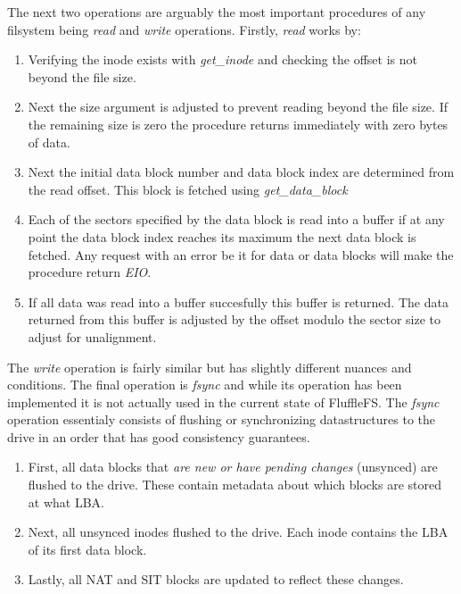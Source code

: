 The next two operations are arguably the most important procedures of any
filsystem being \textit{read} and \textit{write} operations. Firstly,
\textit{read} works by:

\begin{enumerate}
    \item Verifying the inode exists with \textit{get\_inode} and checking the
    offset is not beyond the file size.
    \item Next the size argument is adjusted to prevent reading beyond the file
    size. If the remaining size is zero the procedure returns immediately with
    zero bytes of data.
    \item Next the initial data block number and data block index are determined
    from the read offset. This block is fetched using \textit{get\_data\_block}
    \item Each of the sectors specified by the data block is read into a buffer
    if at any point the data block index reaches its maximum the next data
    block is fetched. Any request with an error be it for data or data
    blocks will make the procedure return \textit{EIO}.
    \item If all data was read into a buffer succesfully this buffer is
    returned. The data returned from this buffer is adjusted by the offset
    modulo the sector size to adjust for unalignment.
\end{enumerate}

The \textit{write} operation is fairly similar but has slightly different
nuances and conditions. The final operation is \textit{fsync} and while its
operation has been implemented it is not actually used in the current state
of FluffleFS. The \textit{fsync} operation essentialy consists of flushing
or synchronizing datastructures to the drive in an order that has good
consistency guarantees.

\begin{enumerate}
    \item First, all data blocks that \textit{are new or have pending changes}
          (unsynced) are flushed to the drive. These contain metadata about
          which blocks are stored at what LBA.
    \item Next, all unsynced inodes flushed to the drive. Each inode contains the
          LBA of its first data block.
    \item Lastly, all NAT and SIT blocks are updated to reflect these changes.
\end{enumerate}

